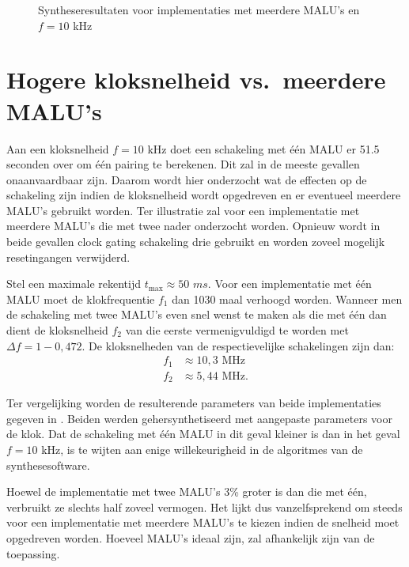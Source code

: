 \begin{figure}[h]
	\centering
		\caption{Syntheseresultaten voor implementaties met meerdere MALU's en $f = 10$ kHz\label{figuur-resultaten-md}}
\end{figure}

\section{Hogere kloksnelheid vs.\ meerdere MALU's}

Aan een kloksnelheid $f = 10$ kHz doet een schakeling met \'e\'en MALU er 51.5 seconden over om \'e\'en pairing te berekenen. Dit zal  in de meeste gevallen onaanvaardbaar zijn. Daarom wordt hier onderzocht wat de effecten op de schakeling zijn indien de kloksnelheid wordt opgedreven en er eventueel meerdere MALU's gebruikt worden. Ter illustratie zal voor een implementatie met meerdere MALU's die met twee nader onderzocht worden. Opnieuw wordt in beide gevallen clock gating schakeling drie gebruikt en worden zoveel mogelijk resetingangen verwijderd.

Stel een maximale rekentijd $t_{\text{max}} \approx 50$ $ms$. Voor een implementatie met \'e\'en MALU moet de klokfrequentie $f_1$ dan 1030 maal verhoogd worden. Wanneer men de schakeling met twee MALU's even snel wenst te maken als die met \'e\'en dan dient de kloksnelheid $f_2$ van die eerste vermenigvuldigd te worden met $\Delta f = 1 - 0,472$. De kloksnelheden van de respectievelijke schakelingen zijn dan:
\[\begin{aligned}
f_1	&\approx 10,3\text{ MHz}\\
f_2	&\approx 5,44\text{ MHz}.
\end{aligned}\]

Ter vergelijking worden de resulterende parameters van beide implementaties gegeven in . Beiden werden gehersynthetiseerd met aangepaste parameters voor de klok. Dat de schakeling met \'e\'en MALU in dit geval kleiner is dan in het geval $f = 10$ kHz, is te wijten aan enige willekeurigheid in de algoritmes van de synthesesoftware.

Hoewel de implementatie met twee MALU's 3\% groter is dan die met \'e\'en, verbruikt ze slechts half zoveel vermogen. Het lijkt dus vanzelfsprekend om steeds voor een implementatie met meerdere MALU's te kiezen indien de snelheid moet opgedreven worden. Hoeveel MALU's ideaal zijn, zal afhankelijk zijn van de toepassing.

